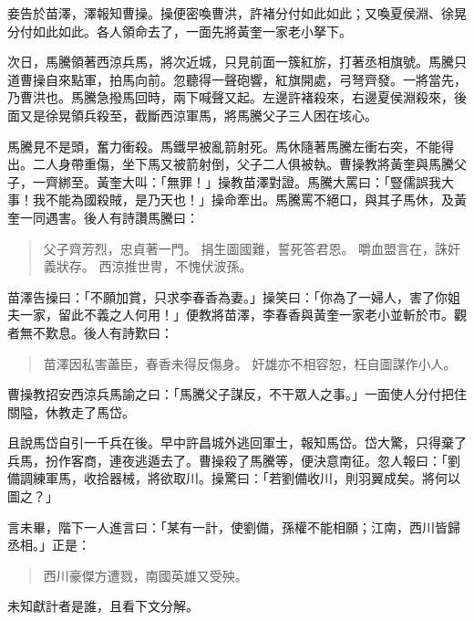 妾告於苗澤，澤報知曹操。操便密喚曹洪，許褚分付如此如此；又喚夏侯淵、徐晃分付如此如此。各人領命去了，一面先將黃奎一家老小拏下。

次日，馬騰領著西涼兵馬，將次近城，只見前面一簇紅旂，打著丞相旗號。馬騰只道曹操自來點軍，拍馬向前。忽聽得一聲砲響，紅旗開處，弓弩齊發。一將當先，乃曹洪也。馬騰急撥馬回時，兩下喊聲又起。左邊許褚殺來，右邊夏侯淵殺來，後面又是徐晃領兵殺至，截斷西涼軍馬，將馬騰父子三人困在垓心。

馬騰見不是頭，奮力衝殺。馬鐵早被亂箭射死。馬休隨著馬騰左衝右突，不能得出。二人身帶重傷，坐下馬又被箭射倒，父子二人俱被執。曹操教將黃奎與馬騰父子，一齊綁至。黃奎大叫：「無罪！」操教苗澤對證。馬騰大罵曰：「豎儒誤我大事！我不能為國殺賊，是乃天也！」操命牽出。馬騰罵不絕口，與其子馬休，及黃奎一同遇害。後人有詩讚馬騰曰：

\begin{quote}
父子齊芳烈，忠貞著一門。
捐生圖國難，誓死答君恩。
嚼血盟言在，誅奸義狀存。
西涼推世冑，不愧伏波孫。
\end{quote}

苗澤告操曰：「不願加賞，只求李春香為妻。」操笑曰：「你為了一婦人，害了你姐夫一家，留此不義之人何用！」便教將苗澤，李春香與黃奎一家老小並斬於市。觀者無不歎息。後人有詩歎曰：

\begin{quote}
苗澤因私害藎臣，春香未得反傷身。
奸雄亦不相容恕，枉自圖謀作小人。
\end{quote}

曹操教招安西涼兵馬諭之曰：「馬騰父子謀反，不干眾人之事。」一面使人分付把住關隘，休教走了馬岱。

且說馬岱自引一千兵在後。早中許昌城外逃回軍士，報知馬岱。岱大驚，只得棄了兵馬，扮作客商，連夜逃遁去了。曹操殺了馬騰等，便決意南征。忽人報曰：「劉備調練軍馬，收拾器械，將欲取川。操驚曰：「若劉備收川，則羽翼成矣。將何以圖之？」

言未畢，階下一人進言曰：「某有一計，使劉備，孫權不能相願；江南，西川皆歸丞相。」正是：

\begin{quote}
西川豪傑方遭戮，南國英雄又受殃。
\end{quote}

未知獻計者是誰，且看下文分解。
